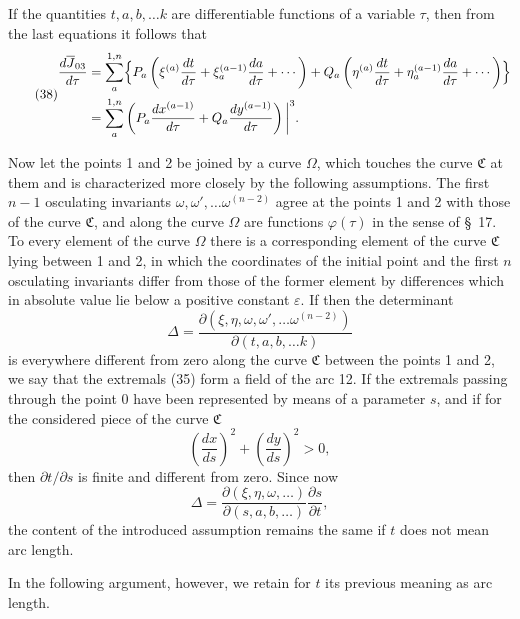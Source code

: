 \documentclass[11pt,a4paper,leqno]{article}
\begin{document}
If the quantities $t,a,b,\ldots k$ are differentiable functions of a variable $\tau$, then from the last equations it follows that
\begin{equation}\tag{38}
\begin{aligned}
\frac{d\overline{J}_{03}}{d\tau}
&=\sum_a^{1,n}\Bigl\{
P_a\left(\xi^{(a)}\frac{dt}{d\tau}+\xi_a^{(a-1)}\frac{da}{d\tau}+\cdots\right)
+Q_a\left(\eta^{(a)}\frac{dt}{d\tau}+\eta_a^{(a-1)}\frac{da}{d\tau}+\cdots\right)
\Bigr\}\\
&=\sum_a^{1,n}\left(P_a\frac{dx^{(a-1)}}{d\tau}
+Q_a\frac{dy^{(a-1)}}{d\tau}\right)\bigg|^3 .
\end{aligned}
\end{equation}

Now let the points 1 and 2 be joined by a curve $\Omega$, which touches the curve $\mathfrak{C}$ at them and is characterized more closely by the following assumptions. The first $n-1$ osculating invariants $\omega,\omega',\ldots\omega^{(n-2)}$ agree at the points 1 and 2 with those of the curve $\mathfrak{C}$, and along the curve $\Omega$ are functions $\varphi(\tau)$ in the sense of \S~17. To every element of the curve $\Omega$ there is a corresponding element of the curve $\mathfrak{C}$ lying between 1 and 2, in which the coordinates of the initial point and the first $n$ osculating invariants differ from those of the former element by differences which in absolute value lie below a positive constant $\varepsilon$. If then the determinant
\[
\Delta=\frac{\partial(\xi,\eta,\omega,\omega',\ldots\omega^{(n-2)})}
{\partial(t,a,b,\ldots k)}
\]
is everywhere different from zero along the curve $\mathfrak{C}$ between the points 1 and 2, we say that the extremals (35) form
a field of the arc 12. If the extremals passing through the point 0 have been represented by means of a parameter $s$, and if for the considered piece of the curve $\mathfrak{C}$
\[
\left(\frac{dx}{ds}\right)^2+\left(\frac{dy}{ds}\right)^2>0,
\]
then $\partial t/\partial s$ is finite and different from zero. Since now
\[
\Delta=\frac{\partial(\xi,\eta,\omega,\ldots)}{\partial(s,a,b,\ldots)}
\frac{\partial s}{\partial t},
\]
the content of the introduced assumption remains the same if $t$ does not mean arc length.

In the following argument, however, we retain for $t$ its previous meaning as arc length.
\end{document}
